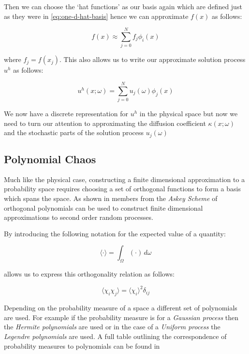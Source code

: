 Then we can choose the `hat functions' as our basis again which are defined
just as they were in \ref{eq:one-d-hat-basis} hence we can approximate $f(x)$
as follows:

\begin{equation}\label{eq:oned-stochastic-f-approx}
    f(x) \approx \sum_{j=0}^Nf_j\phi_i(x)
\end{equation}

where $f_j = f(x_j)$. This also allows us to write our approximate solution
process $u^h$ as follows:

\begin{equation}\label{eq:oned-stochastic-uh}
    u^h(x;\omega) = \sum_{j=0}^Nu_j(\omega)\phi_j(x)
\end{equation}

We now have a discrete representation for $u^h$ in the physical space but now
we need to turn our attention to approximating the diffusion coefficient
$\kappa(x;\omega)$ and the stochastic parts of the solution process
$u_j(\omega)$

\subsection{Polynomial Chaos}

Much like the physical case, constructing a finite dimensional approximation to
a probability space requires choosing a set of orthogonal functions to form a
basis which spans the space. As shown in \cite{gpc} members from the
\textit{Askey Scheme} of orthogonal polynomials can be used to construct finite
dimensional approximations to second order random processes.

By introducing the following notation for the expected value of a quantity:

\begin{equation}\label{eq:oned-stochastic-expect-notation}
    \langle\cdot\rangle = \int_{\Omega}(\cdot) \,d\omega
\end{equation}

allows us to express this orthogonality relation as follows:

\begin{equation}\label{oned-stochastic-orthog-relation}
    \langle\chi_i\chi_j\rangle = \langle\chi_i\rangle^2\delta_{ij}
\end{equation}

Depending on the probability measure of a space a different set of polynomials
are used. For example if the probability measure is for a
\textit{Gaussian process} then the \textit{Hermite polynomials} are used or in
the case of a \textit{Uniform process} the \textit{Legendre polynomials} are
used. A full table outlining the correspondence of probability measures to
polynomials can be found in \cite{general-poly-chaos}

